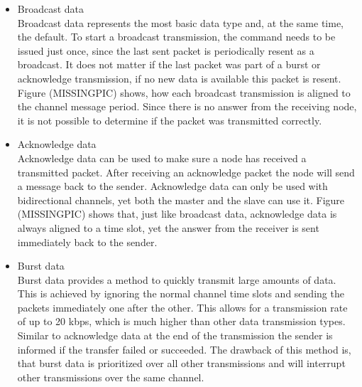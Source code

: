 \begin{itemize}
	\item{Broadcast data} \hfill \\ Broadcast data represents the most basic data type and, at the same time, the default. To start a broadcast transmission, the command needs to be issued just once, since the last sent packet is periodically resent as a broadcast. It does not matter if the last packet was part of a burst or acknowledge transmission, if no new data is available this packet is resent. Figure (MISSINGPIC) shows, how each broadcast transmission is aligned to the channel message period.	Since there is no answer from the receiving node, it is not possible to determine if the packet was transmitted correctly.
	
	\item{Acknowledge data} \hfill \\ Acknowledge data can be used to make sure a node has received a transmitted packet. After receiving an acknowledge packet the node will send a message back to the sender. Acknowledge data can only be used with bidirectional channels, yet both the master and the slave can use it. Figure (MISSINGPIC) shows that, just like broadcast data, acknowledge data is always aligned to a time slot, yet the answer from the receiver is sent immediately back to the sender.
	
	\item{Burst data} \hfill \\ Burst data provides a method to quickly transmit large amounts of data. This is achieved by ignoring the normal channel time slots and sending the packets immediately one after the other. This allows for a transmission rate of up to 20 kbps, which is much higher than other data transmission types. Similar to acknowledge data at the end of the transmission the sender is informed if the transfer failed or succeeded. The drawback of this method is, that burst data is prioritized over all other transmissions and will interrupt other transmissions over the same channel.
\end{itemize}


